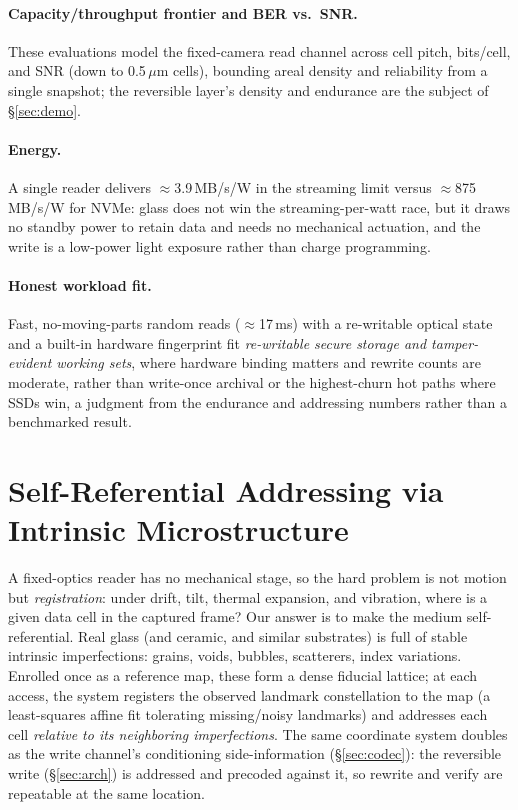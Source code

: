 \documentclass[letterpaper,twocolumn,10pt]{article}
\begin{document}
\paragraph{Capacity/throughput frontier and BER vs.\ SNR.} These evaluations model the
fixed-camera read channel across cell pitch, bits/cell, and SNR (down to 0.5\,$\mu$m cells),
bounding areal density and reliability from a single snapshot; the reversible layer's
density and endurance are the subject of \S\ref{sec:demo}.

\paragraph{Energy.} A single reader delivers $\approx$3.9\,MB/s/W in the streaming limit
versus $\approx$875\,MB/s/W for NVMe: glass does not win the streaming-per-watt race, but it
draws no standby power to retain data and needs no mechanical actuation, and the write is a
low-power light exposure rather than charge programming.

\paragraph{Honest workload fit.} Fast, no-moving-parts random reads ($\approx$17\,ms)
with a re-writable optical state and a built-in hardware fingerprint fit
\emph{re-writable secure storage and tamper-evident working sets}, where hardware
binding matters and rewrite counts are moderate, rather than write-once archival or
the highest-churn hot paths where SSDs win, a judgment from the endurance and
addressing numbers rather than a benchmarked result.

\section{Self-Referential Addressing via Intrinsic Microstructure}
\label{sec:landmarks}
A fixed-optics reader has no mechanical stage, so the hard problem is not motion but
\emph{registration}: under drift, tilt, thermal expansion, and vibration, where is a
given data cell in the captured frame? Our answer is to make the medium
self-referential. Real glass (and ceramic, and similar substrates) is full of stable
intrinsic imperfections: grains, voids, bubbles, scatterers, index variations.
Enrolled once as a reference map, these form a dense fiducial lattice; at each access,
the system registers the observed landmark constellation to the map (a least-squares
affine fit tolerating missing/noisy landmarks) and addresses each cell \emph{relative
to its neighboring imperfections}. The same coordinate system doubles as the write
channel's conditioning side-information (\S\ref{sec:codec}): the reversible write
(\S\ref{sec:arch}) is addressed and precoded against it, so rewrite and verify are
repeatable at the same location.
\end{document}
